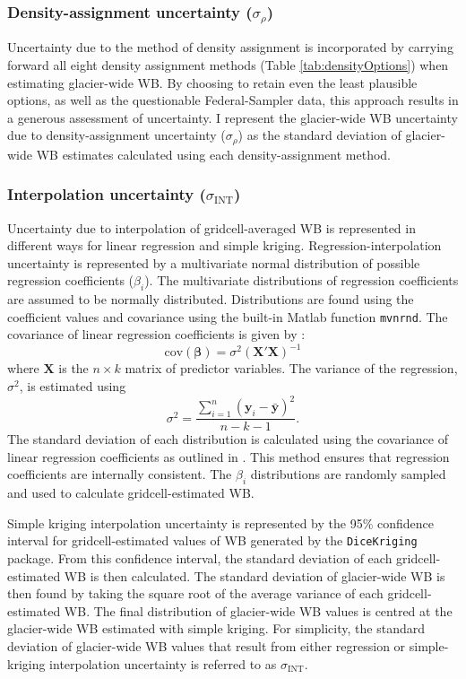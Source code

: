 \documentclass{sfuthesis}
\begin{document}
{	\subsubsection{Density-assignment uncertainty ($\sigma_{\rho}$)}
Uncertainty due to the method of density assignment is incorporated by carrying forward all eight density assignment methods (Table \ref{tab:densityOptions}) when estimating glacier-wide WB. By choosing to retain even the least plausible options, as well as the questionable Federal-Sampler data, this approach results in a generous assessment of uncertainty. I represent the glacier-wide WB uncertainty due to density-assignment uncertainty ($\sigma_{\rho}$) as the standard deviation of glacier-wide WB estimates calculated using each density-assignment method.

	\subsubsection{Interpolation uncertainty ($\sigma_{\mathrm{INT}}$)}
Uncertainty due to interpolation of gridcell-averaged WB is represented in different ways for linear regression and simple kriging. Regression-interpolation uncertainty is represented by a multivariate normal distribution of possible regression coefficients ($\beta_i$). The multivariate distributions of regression coefficients are assumed to be normally distributed. Distributions are found using the coefficient values and covariance using the built-in Matlab function \texttt{mvnrnd}. The covariance of linear regression coefficients is given by \citep{Bagos2015}:
\begin{equation}
\mathrm{cov}\left( \boldsymbol{\beta} \right) = \sigma^2 \left( \boldsymbol{X}'  \boldsymbol{X} \right)^{-1}
\end{equation}
where $\boldsymbol{X}$ is the $n \times k$ matrix of predictor variables. The variance of the regression, $\sigma^2$, is estimated using
\begin{equation}
\sigma^2 = \frac{\sum^n_{i=1} \left(\boldsymbol{y}_i-\bar{\boldsymbol{y}} \right)^2}{n-k-1}.
\end{equation}
The standard deviation of each distribution is calculated using the covariance of linear regression coefficients as outlined in \cite{Bagos2015}. This method ensures that regression coefficients are internally consistent. The $\beta_i$ distributions are randomly sampled and used to calculate gridcell-estimated WB.	

Simple kriging interpolation uncertainty is represented by the 95\% confidence interval for gridcell-estimated values of WB generated by the \texttt{DiceKriging} package. From this confidence interval, the standard deviation of each gridcell-estimated WB is then calculated. The standard deviation of glacier-wide WB is then found by taking the square root of the average variance of each gridcell-estimated WB. The final distribution of glacier-wide WB values is centred at the glacier-wide WB estimated with simple kriging. For simplicity, the standard deviation of glacier-wide WB values that result from either regression or simple-kriging interpolation uncertainty is referred to as $\sigma_{\mathrm{INT}}$.


}
\end{document}
